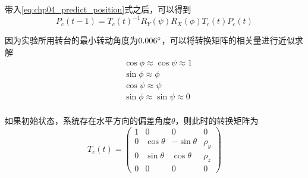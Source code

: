 带入\ref{eq:chp04_predict_position}式之后，可以得到
\begin{equation}
P_c(t-1) =T_c(t)^{-1}R_Y(\psi)R_X(\phi)T_c(t) P_c(t)
\end{equation}

因为实验所用转台的最小转动角度为$0.006 \degree$，可以将转换矩阵的相关量进行近似求解
\begin{align}
&\cos \phi \approx \cos \psi \approx 1 \\
&\sin \phi \approx \phi \\
&\cos \psi \approx \psi \\
&\sin \phi \approx \sin \psi \approx 0 \\
\end{align}

如果初始状态，系统存在水平方向的偏差角度$\theta$，则此时的转换矩阵为
\begin{equation}
T_c(t) =\begin{pmatrix} 1 & 0 & 0 & 0 \\ 0 & \cos \theta & -\sin \theta & \rho_y \\0 & \sin \theta & \cos \theta & \rho_z \\ 0 & 0 & 0 &0 \end{pmatrix}
\end{equation}

